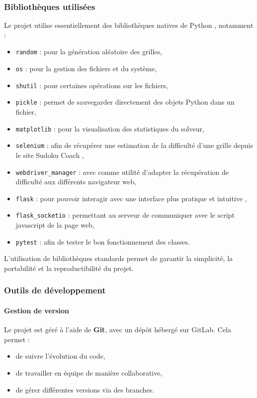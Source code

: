 \documentclass[a4paper]{article}
\begin{document}
\subsubsection{Bibliothèques utilisées}

Le projet utilise essentiellement des bibliothèques natives de Python \textbf{\cite{python}}, notamment :
\begin{itemize}
    \item \texttt{random} : pour la génération aléatoire des grilles,
    \item \texttt{os} : pour la gestion des fichiers et du système,
    \item \texttt{shutil} : pour certaines opérations sur les fichiers,
    \item \texttt{pickle} : permet de sauvegarder directement des objets Python dans un fichier,
    \item \texttt{matplotlib} : pour la visualisation des statistiques du solveur,
    \item \texttt{selenium} : afin de récupérer une estimation de la difficulté d'une grille depuis le site Sudoku Coach \textbf{\cite{sudokucoach}},
    \item \texttt{webdriver\_manager} : avec comme utilité d'adapter la récupération de difficulté aux différents navigateur web,
    \item \texttt{flask} : pour pouvoir interagir avec une interface plus pratique et intuitive \textbf{\cite{flask}},
    \item \texttt{flask\_socketio} : permettant au serveur de communiquer avec le script javascript de la page web,
    \item \texttt{pytest} : afin de tester le bon fonctionnement des classes.
\end{itemize}

L’utilisation de bibliothèques standards permet de garantir la simplicité, la portabilité et la reproductibilité du projet.

\subsubsection{Outils de développement}

\paragraph{Gestion de version}

Le projet est géré à l’aide de \textbf{Git}, avec un dépôt hébergé sur GitLab. Cela permet :
\begin{itemize}
    \item de suivre l’évolution du code,
    \item de travailler en équipe de manière collaborative,
    \item de gérer différentes versions via des branches.
\end{itemize}
\end{document}
